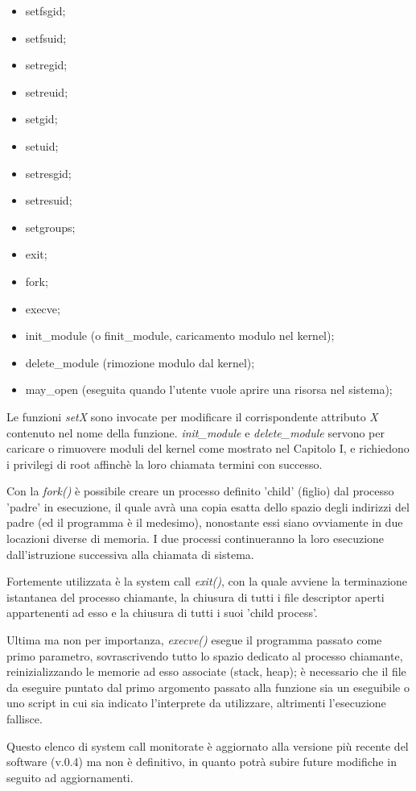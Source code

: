 \begin{itemize}
\item setfsgid;
\item setfsuid;
\item setregid;
\item setreuid;
\item setgid;
\item setuid;
\item setresgid;
\item setresuid;
\item setgroups;
\item exit;
\item fork;
\item execve;
\item init\_module (o finit\_module, caricamento modulo nel kernel);
\item delete\_module (rimozione modulo dal kernel);
\item may\_open (eseguita quando l'utente vuole aprire una risorsa nel sistema);
\end{itemize}

Le funzioni \emph{setX} sono invocate per modificare il corrispondente attributo \emph{X} contenuto nel nome della funzione. \emph{init\_module} e \emph{delete\_module} servono per caricare o rimuovere moduli del kernel come mostrato nel Capitolo I, e richiedono i privilegi di root affinchè la loro chiamata termini con successo.

Con la \emph{fork()} è possibile creare un processo definito 'child' (figlio) dal processo 'padre' in esecuzione, il quale avrà una copia esatta dello spazio degli indirizzi del padre (ed il programma è il medesimo), nonostante essi siano ovviamente in due locazioni diverse di memoria. I due processi continueranno la loro esecuzione dall'istruzione successiva alla chiamata di sistema.

Fortemente utilizzata è la system call \emph{exit()}, con la quale avviene la terminazione istantanea del processo chiamante, la chiusura di tutti i file descriptor aperti appartenenti ad esso e la chiusura di tutti i suoi 'child process'.

Ultima ma non per importanza, \emph{execve()} esegue il programma passato come primo parametro, sovrascrivendo tutto lo spazio dedicato al processo chiamante, reinizializzando le memorie ad esso associate (stack, heap); è necessario che il file da eseguire puntato dal primo argomento passato alla funzione sia un eseguibile o uno script in cui sia indicato l'interprete da utilizzare, altrimenti l'esecuzione fallisce.

Questo elenco di system call monitorate è aggiornato alla versione più recente del software (v.0.4) ma non è definitivo, in quanto potrà subire future modifiche in seguito ad aggiornamenti.
